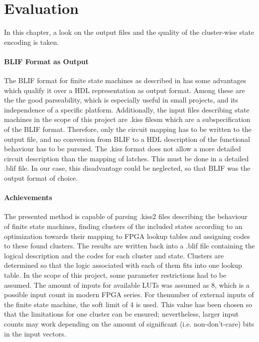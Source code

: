 \chapter{Evaluation}
\label{cha:Evaluation}

In this chapter, a look on the output files and the quality of the cluster-wise state encoding is taken.

\subsubsection{BLIF Format as Output}
\label{subsubsec:BLIFOutput}

The BLIF format for finite state machines as described in \cite{blif} has some advantages which qualify it over a HDL representation as output format. Among these are the the good parseability, which is especially useful in small projects, and its independence of a specific platform.
Additionally, the input files describing state machines in the scope of this project are .kiss filesm which are a subspecification of the BLIF format. Therefore, only the circuit mapping has to be written to the output file, and no conversion from BLIF to a HDL description of the functional behaviour has to be pursued. The .kiss format does not allow a more detailed circuit description than the mapping of latches. This must be done in a detailed .blif file. In our case, this disadvantage could be neglected, so that BLIF was the output format of choice.

\subsubsection{Achievements}
\label{subsubsec:Achievements}

The presented method is capable of parsing .kiss2 files describing the behaviour of finite state machines, finding clusters of the included states
according to an optimization towards their mapping to FPGA lookup tables and assigning codes to these found clusters. The results are written back into a .blif file containing the logical description and the codes for each cluster and state. Clusters are determined so that the logic associated with each of them fits into one lookup table. In the scope of this project, some parameter restrictions had to be assumed. The amount of inputs for available LUTs was assumed as 8, which is a possible input count in modern FPGA series. For thenumber of external inputs of the finite state machine, the soft limit of 4 is used. This value has been chosen so that the limitations for one cluster can be ensured; nevertheless, larger input counts may work depending on the amount of significant (i.e. non-don't-care) bits in the input vectors.

